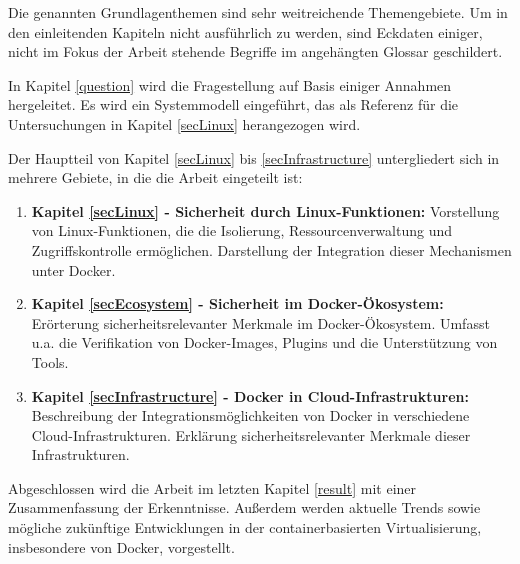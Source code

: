 \documentclass[../main.tex]{subfiles}
\begin{document}
    Die genannten Grundlagenthemen sind sehr weitreichende Themengebiete. Um in den einleitenden Kapiteln nicht ausführlich zu werden, sind Eckdaten einiger, nicht im Fokus der Arbeit stehende Begriffe im angehängten Glossar geschildert.

    In Kapitel \ref{question} wird die Fragestellung auf Basis einiger Annahmen hergeleitet. Es wird ein Systemmodell eingeführt, das als Referenz für die Untersuchungen in Kapitel \ref{secLinux} herangezogen wird.

    Der Hauptteil von Kapitel \ref{secLinux} bis \ref{secInfrastructure} untergliedert sich in mehrere Gebiete, in die die Arbeit eingeteilt ist:
    \begin{enumerate}
      \item \textbf{Kapitel \ref{secLinux} - Sicherheit durch Linux-Funktionen:} Vorstellung von Linux-Funktionen, die die Isolierung, Ressourcenverwaltung und Zugriffskontrolle ermöglichen. Darstellung der Integration dieser Mechanismen unter Docker.
      \item \textbf{Kapitel \ref{secEcosystem} - Sicherheit im Docker-Ökosystem:} Erörterung sicherheitsrelevanter Merkmale im Docker-Ökosystem. Umfasst u.a. die Verifikation von Docker-Images, Plugins und die Unterstützung von Tools.
      \item \textbf{Kapitel \ref{secInfrastructure} - Docker in Cloud-Infrastrukturen:} Beschreibung der Integrationsmöglichkeiten von Docker in verschiedene Cloud-Infrastrukturen. Erklärung sicherheitsrelevanter Merkmale dieser Infrastrukturen.
    \end{enumerate}

    Abgeschlossen wird die Arbeit im letzten Kapitel \ref{result} mit einer Zusammenfassung der Erkenntnisse. Außerdem werden aktuelle Trends sowie mögliche zukünftige Entwicklungen in der containerbasierten Virtualisierung, insbesondere von Docker, vorgestellt.
\end{document}
